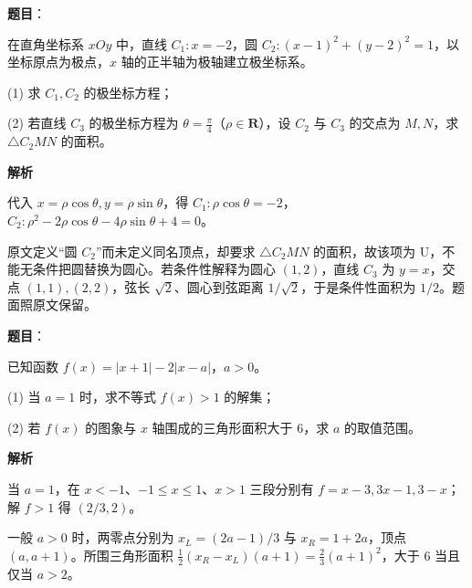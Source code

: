 \begin{answer}

\textbf{题目}：

在直角坐标系 $xOy$ 中，直线 $C_1:x=-2$，圆 $C_2:(x-1)^2+(y-2)^2=1$，以坐标原点为极点，$x$ 轴的正半轴为极轴建立极坐标系。

(1) 求 $C_1,C_2$ 的极坐标方程；

(2) 若直线 $C_3$ 的极坐标方程为 $\theta=\frac\pi4$（$\rho\in\mathbf R$），设 $C_2$ 与 $C_3$ 的交点为 $M,N$，求 $\triangle C_2MN$ 的面积。

\textbf{解析}


代入 $x=\rho\cos\theta,y=\rho\sin\theta$，得 $C_1:\rho\cos\theta=-2$，$C_2:\rho^2-2\rho\cos\theta-4\rho\sin\theta+4=0$。


原文定义“圆 $C_2$”而未定义同名顶点，却要求 $\triangle C_2MN$ 的面积，故该项为 U，不能无条件把圆替换为圆心。若条件性解释为圆心 $(1,2)$，直线 $C_3$ 为 $y=x$，交点 $(1,1),(2,2)$，弦长 $\sqrt2$、圆心到弦距离 $1/\sqrt2$，于是条件性面积为 $1/2$。题面照原文保留。



\end{answer}
\begin{answer}

\textbf{题目}：

已知函数 $f(x)=|x+1|-2|x-a|$，$a>0$。

(1) 当 $a=1$ 时，求不等式 $f(x)>1$ 的解集；

(2) 若 $f(x)$ 的图象与 $x$ 轴围成的三角形面积大于 6，求 $a$ 的取值范围。

\textbf{解析}


当 $a=1$，在 $x<-1$、$-1\leq x\leq1$、$x>1$ 三段分别有 $f=x-3,3x-1,3-x$；解 $f>1$ 得 $(2/3,2)$。


一般 $a>0$ 时，两零点分别为 $x_L=(2a-1)/3$ 与 $x_R=1+2a$，顶点 $(a,a+1)$。所围三角形面积 $\frac12(x_R-x_L)(a+1)=\frac23(a+1)^2$，大于 6 当且仅当 $a>2$。



\end{answer}
